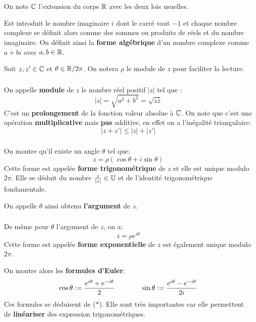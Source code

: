 \chapter*{}
On note \(\mathbb{C}\) l'extension du corps \(\mathbb{R}\) avec les deux lois usuelles. \< 

Est introduit le nombre imaginaire \(i\) dont le carré vaut \(-1\) et chaque nombre complexe se définit alors comme des sommes ou produits de réels et du nombre imaginaire.\+
On définit ainsi la \textbf{forme algébrique} d'un nombre complexe comme \(a + bi\) avec \(a, b \in \mathbb{R}\). \<

Soit \(z, z' \in \mathbb{C}\) et \(\theta \in \mathbb{R}/2\pi\). On notera \(\rho\) le module de \(z\) pour faciliter la lecture.

\subsection*{}
On appelle \textbf{module} de \(z\) le nombre réel positif \(|z|\) tel que {:}
\[
    \boxed{
        |z| = \sqrt{a^2 + b^2} = \sqrt{z\overline{z}} 
    }
\]
C'est un \textbf{prolongement} de la fonction valeur absolue à \(\mathbb{C}\).
On note que c'est une opération \textbf{multiplicative} mais \textbf{pas} additive, en effet on a l'inégalité triangulaire:
\[
   |z + z'| \leq |z| + |z'|   
\]
\subsection*{}
On montre qu'il existe un angle \(\theta\) tel que:
\[
    \boxed{
       z = \rho(\cos\theta+i\sin\theta)   
    }
\]
Cette forme est appelée \textbf{forme trigonométrique} de \(z\) et elle est unique modulo \(2\pi\).\+
Elle se déduit du nombre \(\frac{z}{|z|} \in \mathbb{U}\) et de l'identité trigonométrique fondamentale.\<

On appelle \(\theta\) ainsi obtenu \textbf{l'argument} de \(z\).
\subsection*{}
De même pour \(\theta\) l'argument de \(z\), on a:
\[
    \boxed{
        z = \rho e^{i\theta} 
    }
\]
Cette forme est appelée \textbf{forme exponentielle} de \(z\) est également unique modulo \(2\pi\).\<

On montre alors les \textbf{formules d'Euler}:
\[
  \begin{aligned}
     \cos\theta := \frac{e^{i\theta}+e^{-i\theta}}{2}
  \end{aligned}
  \hspace*{40pt}
  \begin{aligned}
     \sin\theta := \frac{e^{i\theta}-e^{-i\theta}}{2i}
  \end{aligned}
\]
Ces formules se déduisent de (\(\ast\)). Elle sont très importantes car elle permettent de \textbf{linéariser} des expression trigonométriques.\<

